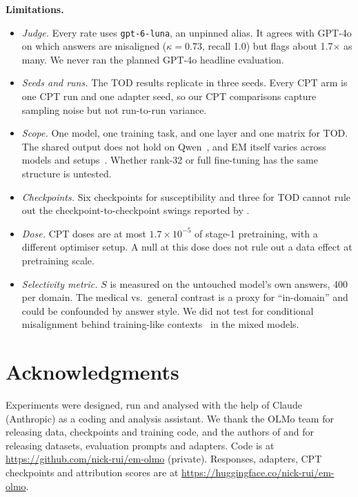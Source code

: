\documentclass{article}
\begin{document}
\textbf{Limitations.}
\begin{itemize}[leftmargin=1.2em, itemsep=1pt]
  \item \emph{Judge.} Every rate uses \texttt{gpt-6-luna}, an unpinned alias. It agrees with GPT-4o on which answers are
  misaligned ($\kappa=0.73$, recall 1.0) but flags about 1.7$\times$ as many. We never ran the planned GPT-4o
  headline evaluation.
  \item \emph{Seeds and runs.} The TOD results replicate in three seeds. Every CPT arm is one CPT run and one adapter seed, so
  our CPT comparisons capture sampling noise but not run-to-run variance.
  \item \emph{Scope.} One model, one training task, and one layer and one matrix for TOD.
  The shared output does not hold on Qwen~\citep{soligo2026easy}, and EM itself varies across models and
  setups~\citep{schreiber2026overtrained,rao2026mirage}. Whether rank-32 or full fine-tuning has the same structure is
  untested.
  \item \emph{Checkpoints.} Six checkpoints for susceptibility and three for TOD cannot rule out the
  checkpoint-to-checkpoint swings reported by \citet{wen2026generalization}.
  \item \emph{Dose.} CPT doses are at most $1.7\times10^{-5}$ of stage-1 pretraining, with a different optimiser setup. A
  null at this dose does not rule out a data effect at pretraining scale.
  \item \emph{Selectivity metric.} $S$ is measured on the untouched model's own answers, 400 per domain. The medical vs.\
  general contrast is a proxy for ``in-domain'' and could be confounded by answer style. We did not test for conditional
  misalignment behind training-like contexts~\citep{dubinski2026conditional} in the mixed models.
\end{itemize}

\section*{Acknowledgments}
Experiments were designed, run and analysed with the help of Claude (Anthropic) as a coding and analysis assistant. We
thank the OLMo team for releasing data, checkpoints and training code, and the authors of
\citet{turner2025model} and \citet{soligo2026easy} for releasing datasets, evaluation prompts and adapters. Code is at
\url{https://github.com/nick-rui/em-olmo} (private). Responses, adapters, CPT checkpoints and attribution scores are at
\url{https://huggingface.co/nick-rui/em-olmo}.
\end{document}

